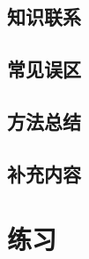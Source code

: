 \documentclass[
    lang=cn,
    color=blue,
    mode=fancy,
    thmcnt=section,
    scheme=chinese
]{elegantbook}
\begin{document}
\begin{figure}[htbp]
    \centering


    \caption{}
    \label{fig:example}
\end{figure}


\section{知识联系}



\section{常见误区}

\begin{remark}



\end{remark}


\section{方法总结}

\begin{conclusion}



\end{conclusion}


\section{补充内容}



\chapter{练习}

\begin{problemset}[练习题]

    \item

    \item

    \item

    \item

    \item

\end{problemset}
\end{document}
